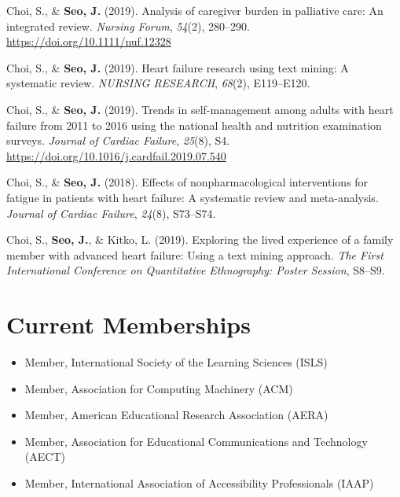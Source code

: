 \documentclass[11pt, a4paper]{awesome-cv}
\providecommand{\tightlist}{%
	\setlength{\itemsep}{0pt}\setlength{\parskip}{0pt}}
\begin{document}
\leavevmode\hypertarget{ref-doi:10.1111ux2fnuf.12328}{}%
Choi, S., \& \textbf{Seo, J.} (2019). Analysis of caregiver burden in palliative care: An integrated review. \emph{Nursing Forum}, \emph{54}(2), 280--290. \url{https://doi.org/10.1111/nuf.12328}

\leavevmode\hypertarget{ref-choi2019heart}{}%
Choi, S., \& \textbf{Seo, J.} (2019). Heart failure research using text mining: A systematic review. \emph{NURSING RESEARCH}, \emph{68}(2), E119--E120.

\leavevmode\hypertarget{ref-choi2019trends}{}%
Choi, S., \& \textbf{Seo, J.} (2019). Trends in self-management among adults with heart failure from 2011 to 2016 using the national health and nutrition examination surveys. \emph{Journal of Cardiac Failure}, \emph{25}(8), S4. \url{https://doi.org/10.1016/j.cardfail.2019.07.540}

\leavevmode\hypertarget{ref-choi2018effects}{}%
Choi, S., \& \textbf{Seo, J.} (2018). Effects of nonpharmacological interventions for fatigue in patients with heart failure: A systematic review and meta-analysis. \emph{Journal of Cardiac Failure}, \emph{24}(8), S73--S74.

\leavevmode\hypertarget{ref-choi2019exploring}{}%
Choi, S., \textbf{Seo, J.}, \& Kitko, L. (2019). Exploring the lived experience of a family member with advanced heart failure: Using a text mining approach. \emph{The First International Conference on Quantitative Ethnography: Poster Session}, S8--S9.

\endgroup

\hypertarget{current-memberships}{%
\section{Current Memberships}\label{current-memberships}}

\begin{itemize}
\tightlist
\item
  Member, International Society of the Learning Sciences (ISLS)
\item
  Member, Association for Computing Machinery (ACM)
\item
  Member, American Educational Research Association (AERA)
\item
  Member, Association for Educational Communications and Technology (AECT)
\item
  Member, International Association of Accessibility Professionals (IAAP)
\end{itemize}
\end{document}
